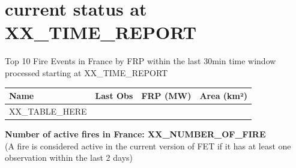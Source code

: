 \documentclass{article}
\begin{document}
\vspace*{-1.5cm} %
\noindent
{}
\vspace{1cm} %

\section{current status at XX_TIME_REPORT}
Top 10 Fire Events in France by FRP within the last 30min time window processed starting at XX_TIME_REPORT
\begin{table}[H]
\centering
\begin{tabular}{llcc}
\toprule
\textbf{Name} & \textbf{Last Obs} & \textbf{FRP (MW)} & \textbf{Area (km²)} \\
\midrule
XX_TABLE_HERE
\bottomrule
\end{tabular}
\end{table}
\textbf{Number of active fires in France: XX_NUMBER_OF_FIRE } \\
(A fire is considered active in the current version of FET if it has at least one observation within the last 2 days)
\end{document}
